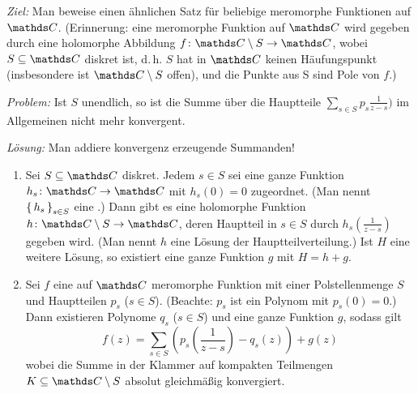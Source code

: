 \emph{Ziel:} Man beweise einen ähnlichen Satz für beliebige meromorphe Funktionen auf $\CC$. (Erinnerung: eine meromorphe Funktion auf $\CC$ wird gegeben durch eine holomorphe Abbildung $f\colon \CC\setminus S \ra \CC$, wobei $S\subseteq \CC$ diskret ist, d.\,h. $S$ hat in $\CC$ keinen Häufungspunkt (insbesondere ist $\CC\setminus S$ offen), und die Punkte aus S sind Pole von $f$.)

\emph{Problem:} Ist $S$ unendlich, so ist die Summe über die Hauptteile $\sum _{s \in S} p_s\frac{1}{z-s})$ im Allgemeinen nicht mehr konvergent.

\emph{Lösung:} Man addiere konvergenz erzeugende Summanden!

\begin{satz}
\begin{enumerate}
\item Sei $S\subseteq\CC$ diskret. Jedem $s \in S$ sei eine ganze Funktion $h_s\colon \CC \ra \CC$ mit $h_s(0) = 0$ zugeordnet.
(Man nennt $\left\{\,h_s\,\right\}_{s \in S}$ eine .)
Dann gibt es eine holomorphe Funktion $h\colon \CC\setminus S \ra \CC$, deren Hauptteil in $s\in S$ durch $h_s(\frac{1}{z-s})$ gegeben wird.
(Man nennt $h$ eine Lösung der Hauptteilverteilung.)
Ist $H$ eine weitere Lösung, so existiert eine ganze Funktion $g$ mit $H = h + g$.
\item Sei $f$ eine auf $\CC$ meromorphe Funktion mit einer Polstellenmenge $S$ und Hauptteilen $p_s$ ($s\in S$).
(Beachte: $p_s$ ist ein Polynom mit $p_s(0) = 0$.)
Dann existieren Polynome $q_s$ ($s \in S$) und eine ganze Funktion $g$, sodass gilt
\[
	f(z) = \sum \limits _{s\in S} \left(p_s\left(\frac{1}{z-s}\right) - q_s(z)\right) + g(z)
\]
wobei die Summe in der Klammer auf kompakten Teilmengen $K \subseteq \CC \setminus S$ absolut gleichmäßig konvergiert.
\end{enumerate}
\end{satz}

